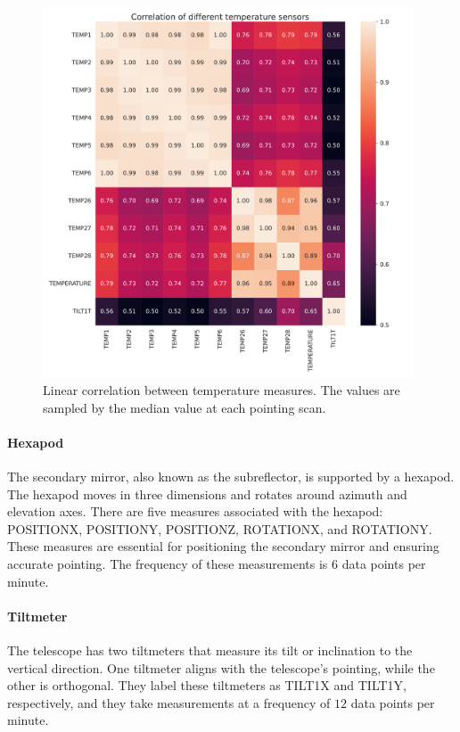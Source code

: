 \begin{figure}[H]
    \centering
    \includegraphics[width=0.98\textwidth]{Correlation/Correlation_temp.pdf}
    \caption{Linear correlation between temperature measures.
    The values are sampled by the median value at each pointing scan.}
    \label{fig:corr_temp}
\end{figure}

\paragraph{Hexapod}
The secondary mirror, also known as the subreflector, is supported by a hexapod.
The hexapod moves in three dimensions and rotates around azimuth and elevation axes.
There are five measures associated with the hexapod: POSITIONX, POSITIONY, POSITIONZ, ROTATIONX, and ROTATIONY.
These measures are essential for positioning the secondary mirror and ensuring accurate pointing. The frequency of these measurements is $6$ data points per minute.

\paragraph{Tiltmeter}
The telescope has two tiltmeters that measure its tilt or inclination to the vertical direction.
One tiltmeter aligns with the telescope's pointing, while the other is orthogonal.
They label these tiltmeters as TILT1X and TILT1Y, respectively, and they take measurements at a frequency of $12$ data points per minute.

